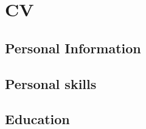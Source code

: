 %
\chapter{CV}
\label{sec:CV}

\section*{Personal Information}

\section*{Personal skills}

\section*{Education}
